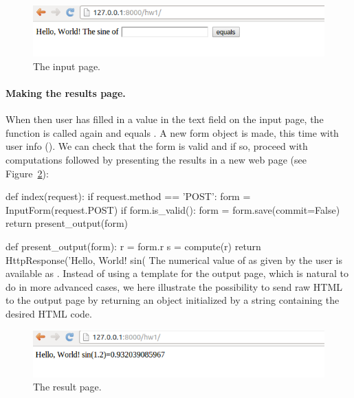\documentclass[%
oneside,                 %
final,                   %
10pt]{article}
\begin{document}
{{{{{\begin{figure}[ht]
  \centerline{\includegraphics[width=0.9\linewidth]{fig-web4sa/hw1_django_input.png}}
  \caption{
  The input page. \label{wf:hw1:django:fig:input}
  }
\end{figure}


\paragraph{Making the results page.}
When then user has filled in a value in the text field on the input
page, the  function is called again and  equals
. A new form object is made, this time with user info ().
We can check that the form is valid and if so, proceed with
computations followed by presenting the results in a
new web page (see Figure~\ref{wf:hw1:django:fig:result}):

\bpycod
def index(request):
    if request.method == 'POST':
        form = InputForm(request.POST)
        if form.is_valid():
            form = form.save(commit=False)
            return present_output(form)

def present_output(form):
    r = form.r
    s = compute(r)
    return HttpResponse('Hello, World! sin(%
\epycod
The numerical value of  as given by the user is available as .
Instead of using a template for the output page, which is natural to
do in more advanced cases, we here illustrate the possibility to
send raw HTML to the output page by returning an 
object initialized by a string containing the desired HTML code.


\begin{figure}[ht]
  \centerline{\includegraphics[width=0.9\linewidth]{fig-web4sa/hw1_django_output.png}}
  \caption{
  The result page. \label{wf:hw1:django:fig:result}
  }
\end{figure}


}}}}}
\end{document}
